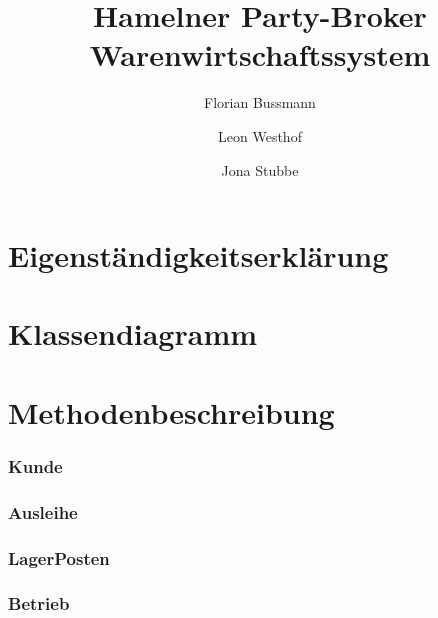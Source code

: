 \documentclass[a4paper,12pt]{article}
\title{Hamelner Party-Broker Warenwirtschaftssystem}
\author{Florian Bussmann \and Leon Westhof \and Jona Stubbe}
\begin{document}
\maketitle
\tableofcontents
\part{Eigenständigkeitserklärung}
\part{Klassendiagramm}
\part{Methodenbeschreibung}
\section{Kunde}
\section{Ausleihe}
\section{LagerPosten}
\section{Betrieb}
\end{document}

